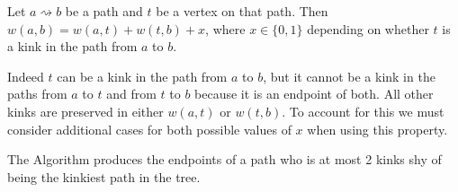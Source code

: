 Let $a \rightsquigarrow b$ be a path and $t$ be a vertex on that path. Then $w(a, b) = w(a, t) + w(t, b) + x$, where $x \in \{0 ,1\}$ depending on whether $t$ is a kink in the path from $a$ to $b$. 

Indeed $t$ can be a kink in the path from $a$ to $b$, but it cannot be a kink in the paths from $a$ to $t$ and from $t$ to $b$ because it is an endpoint of both. All other kinks are preserved in either $w(a, t)$ or $w(t, b)$. To account for this we must consider additional cases for both possible values of $x$ when using this property.



\begin{lem} The Algorithm produces the endpoints of a path who is at most 2 kinks shy of being the kinkiest path in the tree. \end{lem}


